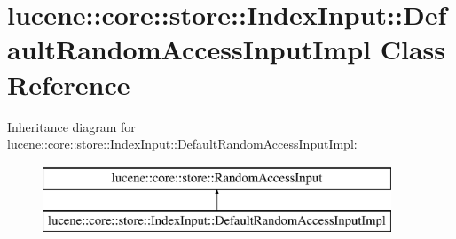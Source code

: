 \hypertarget{classlucene_1_1core_1_1store_1_1IndexInput_1_1DefaultRandomAccessInputImpl}{}\section{lucene\+:\+:core\+:\+:store\+:\+:Index\+Input\+:\+:Default\+Random\+Access\+Input\+Impl Class Reference}
\label{classlucene_1_1core_1_1store_1_1IndexInput_1_1DefaultRandomAccessInputImpl}
Inheritance diagram for lucene\+:\+:core\+:\+:store\+:\+:Index\+Input\+:\+:Default\+Random\+Access\+Input\+Impl\+:\begin{figure}[H]
\begin{center}
\leavevmode
\includegraphics[height=2.000000cm]{classlucene_1_1core_1_1store_1_1IndexInput_1_1DefaultRandomAccessInputImpl}
\end{center}
\end{figure}
